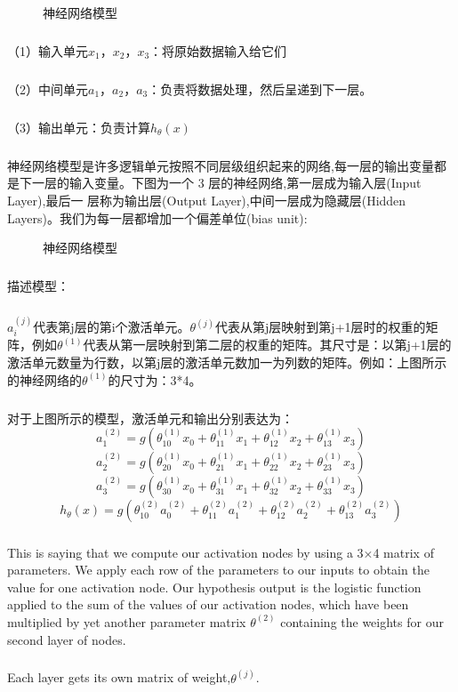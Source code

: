 \documentclass{article}
\begin{document}
\begin{CJK}{UTF8}{gbsn}
\begin{figure}[H]
\caption{神经网络模型}
\label{fig:409}
\end{figure}
\subparagraph{}
（1）输入单元$x_1$，$x_2$，$x_3$：将原始数据输入给它们
\subparagraph{}
（2）中间单元$a_1$，$a_2$，$a_3$：负责将数据处理，然后呈递到下一层。
\subparagraph{}
（3）输出单元：负责计算$h_\theta(x)$
\subparagraph{}
神经网络模型是许多逻辑单元按照不同层级组织起来的网络,每一层的输出变量都是下一层的输入变量。下图为一个 3 层的神经网络,第一层成为输入层(Input Layer),最后一
层称为输出层(Output Layer),中间一层成为隐藏层(Hidden Layers)。我们为每一层都增加一个偏差单位(bias unit):
\begin{figure}[H]
\caption{神经网络模型}
\label{fig:410}
\end{figure}
\subparagraph{}
描述模型：
\subparagraph{}
$a_i^{(j)}$代表第j层的第i个激活单元。$\theta^{(j)}$代表从第j层映射到第j+1层时的权重的矩阵，例如$\theta^{(1)}$代表从第一层映射到第二层的权重的矩阵。其尺寸是：以第j+1层的激活单元数量为行数，以第j层的激活单元数加一为列数的矩阵。例如：上图所示的神经网络的$\theta^{(1)}$的尺寸为：3*4。
\subparagraph{}
对于上图所示的模型，激活单元和输出分别表达为：
\begin{equation}
a_1^{(2)}=g(\theta_{10}^{(1)}x_0+\theta_{11}^{(1)}x_1+\theta_{12}^{(1)}x_2+\theta_{13}^{(1)}x_3)
\end{equation}
\begin{equation}
a_2^{(2)}=g(\theta_{20}^{(1)}x_0+\theta_{21}^{(1)}x_1+\theta_{22}^{(1)}x_2+\theta_{23}^{(1)}x_3)
\end{equation}
\begin{equation}
a_3^{(2)}=g(\theta_{30}^{(1)}x_0+\theta_{31}^{(1)}x_1+\theta_{32}^{(1)}x_2+\theta_{33}^{(1)}x_3)
\end{equation}
\begin{equation}
h_\theta(x)=g(\theta_{10}^{(2)}a_0^{(2)}+\theta_{11}^{(2)}a_1^{(2)}+\theta_{12}^{(2)}a_2^{(2)}+\theta_{13}^{(2)}a_3^{(2)})
\end{equation}
\subparagraph{}
This is saying that we compute our activation nodes by using a 3×4 matrix of parameters. We apply each row of the parameters to our inputs to obtain the value for one activation node. Our hypothesis output is the logistic function applied to the sum of the values of our activation nodes, which have been multiplied by yet another parameter matrix $\theta^{(2)}$ containing the weights for our second layer of nodes.
\subparagraph{}
Each layer gets its own matrix of weight,$\theta^{(j)}$.
\subparagraph{}

\end{CJK}
\end{document}
